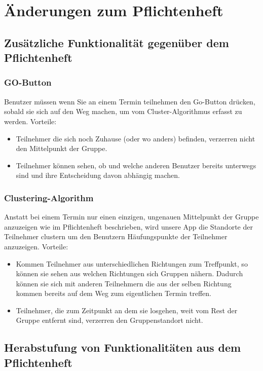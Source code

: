 \section{Änderungen zum Pflichtenheft}
	\subsection{Zusätzliche Funktionalität gegenüber dem Pflichtenheft}
	\subsubsection{GO-Button}
		Benutzer müssen wenn Sie an einem Termin teilnehmen den Go-Button drücken, sobald sie sich auf den Weg machen, um vom Cluster-Algorithmus erfasst zu werden. 
		\newline
		Vorteile:
		\begin{itemize}
		\item Teilnehmer die sich noch Zuhause (oder wo anders) befinden, verzerren nicht den Mittelpunkt der Gruppe.
		\item Teilnehmer können sehen, ob und welche anderen Benutzer bereits unterwegs sind und ihre Entscheidung davon abhängig machen.
		\end{itemize}
	\subsubsection{Clustering-Algorithm}
	Anstatt bei einem Termin nur einen einzigen, ungenauen Mittelpunkt der Gruppe anzuzeigen wie im Pflichtenheft beschrieben, wird unsere App die Standorte der Teilnehmer clustern um den Benutzern Häufungspunkte der Teilnehmer anzuzeigen.
		\newline
		Vorteile:
		\begin{itemize}
		\item Kommen Teilnehmer aus unterschiedlichen Richtungen zum Treffpunkt, so können sie sehen aus welchen Richtungen sich Gruppen nähern. Dadurch können sie sich mit anderen Teilnehmern die aus der selben Richtung kommen bereits auf dem Weg zum eigentlichen Termin treffen.
		\item Teilnehmer, die zum Zeitpunkt an dem sie losgehen, weit vom Rest der Gruppe entfernt sind, verzerren den Gruppenstandort nicht.
		\end{itemize}
	\subsection{Herabstufung von Funktionalitäten aus dem Pflichtenheft}
